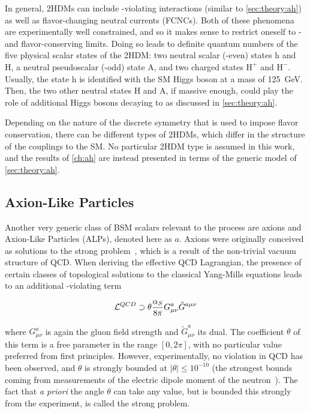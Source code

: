 In general, 2HDMs can include \CP-violating interactions (similar to \cref{sec:theory:ah}) as well as flavor-changing neutral currents (FCNCs). Both of these phenomena are experimentally well constrained, and so it makes sense to restrict oneself to \CP- and flavor-conserving limits. Doing so leads to definite quantum numbers of the five physical scalar states of the 2HDM: two neutral scalar (\CP-even) states h and H, a neutral pseudoscalar (\CP-odd) state A, and two charged states $\mathrm{H}^+$ and $\mathrm{H}^-$. Usually, the state h is identified with the SM Higgs boson at a mass of \SI{125}{\GeV}. Then, the two other neutral states H and A, if massive enough, could play the role of additional Higgs bosons decaying to \ttbar as discussed in \cref{sec:theory:ah}.

Depending on the nature of the discrete symmetry that is used to impose flavor conservation, there can be different types of 2HDMs, which differ in the structure of the couplings to the SM. No particular 2HDM type is assumed in this work, and the results of \cref{ch:ah} are instead presented in terms of the generic model of \cref{sec:theory:ah}.

\subsection{Axion-Like Particles}
\label{sec:theory:alps}

Another very generic class of BSM scalars relevant to the \pptt process are axions and Axion-Like Particles (ALPs), denoted here as $a$. 
Axions were originally conceived as solutions to the strong \CP problem~\cite{Peccei:1977hh,Peccei:1977ur,Weinberg:1977ma,Wilczek:1977pj}, which is a result of the non-trivial vacuum structure of QCD. When deriving the effective QCD Lagrangian, the presence of certain classes of topological solutions to the classical Yang-Mills equations leads to an additional \CP-violating term~\cite{DiLuzio:2020wdo}

\begin{equation}
\label{eq:theory:strongcp}
    \mathcal{L}^{QCD} \supset \theta \frac{\alpha_S}{8 \pi} G^{a}_{\mu \nu} \tilde{G}^{a \mu \nu}
\end{equation}

\noindent where $G^{a}_{\mu \nu}$ is again the gluon field strength and $\tilde{G}^{a}_{\mu \nu}$ its dual. The coefficient $\theta$ of this term is a free parameter in the range $[0,2\pi]$, with no particular value preferred from first principles. However, experimentally, no \CP violation in QCD has been observed, and $\theta$ is strongly bounded at $|\theta| \leq 10^{-10}$ (the strongest bounds coming from measurements of the electric dipole moment of the neutron~\cite{DiLuzio:2020wdo,Pendlebury:2015lrz,Abel:2020pzs}). 
The fact that \textit{a priori} the angle $\theta$ can take any value, but is bounded this strongly from the experiment, is called the strong \CP problem.

